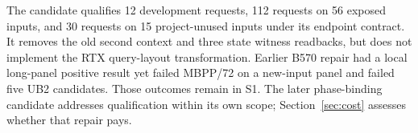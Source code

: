 The candidate qualifies 12 development requests, 112 requests on 56 exposed inputs, and 30 requests on 15 project-unused inputs under its endpoint contract. It removes the old second context and three state witness readbacks, but does not implement the RTX query-layout transformation. Earlier B570 repair had a local long-panel positive result yet failed MBPP/72 on a new-input panel and failed five UB2 candidates. Those outcomes remain in S1. The later phase-binding candidate addresses qualification within its own scope; Section~\ref{sec:cost} assesses whether that repair pays.
